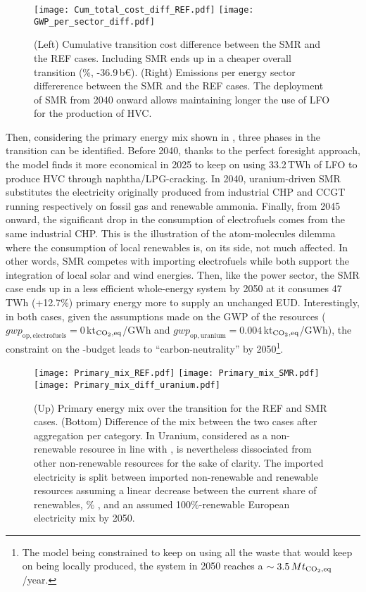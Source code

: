 \begin{figure}[htbp!]
\centering
\texttt{[image: Cum\_total\_cost\_diff\_REF.pdf]}
\texttt{[image: GWP\_per\_sector\_diff.pdf]}
\caption{(Left) Cumulative transition cost difference between the SMR and the REF cases. Including \gls{SMR} ends up in a cheaper overall transition (\%, -36.9\,b€). (Right) Emissions per energy sector differerence between the SMR and the REF cases. The deployment of \gls{SMR} from 2040 onward allows maintaining longer the use of \acrfull{LFO} for the production of \acrfull{HVC}.}
\label{fig:results_deter_overall_emissions_sector}
\end{figure}

Then, considering the primary energy mix shown in , three phases in the transition can be identified. Before 2040, thanks to the perfect foresight approach, the model finds it more economical in 2025 to keep on using 33.2\,TWh of \gls{LFO} to produce \gls{HVC} through naphtha/LPG-cracking. In 2040, uranium-driven \gls{SMR} substitutes the electricity originally produced from industrial \gls{CHP} and \gls{CCGT} running respectively on fossil gas and renewable ammonia. Finally, from 2045 onward, the significant drop in the consumption of electrofuels comes from the same industrial \gls{CHP}. This is the illustration of the atom-molecules dilemma where the consumption of local renewables is, on its side, not much affected. In other words, \gls{SMR} competes with importing electrofuels while both support the integration of local solar and wind energies. Then, like the power sector, the SMR case ends up in a less efficient whole-energy system by 2050 at it consumes 47\,TWh (+12.7\%) primary energy more to supply an unchanged \gls{EUD}. Interestingly, in both cases, given the assumptions made on the \gls{GWP} of the resources (\ie $\mathit{gwp}_{\mathrm{op,electrofuels}}=0$\,kt$_{\ce{CO2},\text{eq}}$/GWh and $\mathit{gwp}_{\mathrm{op,uranium}}=0.004$\,kt$_{\ce{CO2},\text{eq}}$/GWh), the constraint on the -budget leads to ``carbon-neutrality'' by 2050\footnote{The model being constrained to keep on using all the waste that would keep on being locally produced, the system in 2050 reaches a $\sim 3.5\,Mt_{\ce{CO2},\text{eq}}$/year.}.

\begin{figure}[htbp!]
\centering
\texttt{[image: Primary\_mix\_REF.pdf]}
\texttt{[image: Primary\_mix\_SMR.pdf]}
\texttt{[image: Primary\_mix\_diff\_uranium.pdf]}
\caption{(Up) Primary energy mix over the transition for the REF and SMR cases. (Bottom) Difference of the mix between the two cases after aggregation per category. In Uranium, considered as a non-renewable resource in line with \citet{rixhon2021terminology}, is nevertheless dissociated from other non-renewable resources for the sake of clarity. The imported electricity is split between imported non-renewable and renewable resources assuming a linear decrease between the current share of renewables, \% \cite{eurostat_share_re_elec}, and an assumed 100\%-renewable European electricity mix by 2050.}
\label{fig:results_deter_energy_mix}
\end{figure}

